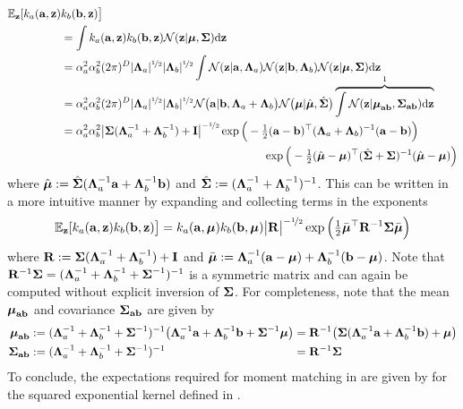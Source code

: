 \begin{align*}
\EE_{\bz}[k_a(\ba,\bz)&k_b(\bb,\bz)\big] \\
&= \int k_a(\ba,\bz)k_b(\bb,\bz) \cN(\bz|\bm, \bS) \dd\bz \\
%
&= \alpha_a^2\alpha_b^2 (2\pi)^{D} |\bLa_a|^{\sha} |\bLa_b|^{\sha}
\int \cN(\bz|\ba,\bLa_a)\cN(\bz|\bb,\bLa_b) \cN(\bz|\bm, \bS) \dd\bz  \\[-0.3cm]
%
&= \alpha_a^2\alpha_b^2 (2\pi)^{D} |\bLa_a|^{\sha} |\bLa_b|^{\sha}
\cN\big(\ba|\bb,\bLa_a+\bLa_b\big) \cN\big(\bm|\hat\bm,\hat\bS \big)
\overbrace{ \int \cN(\bz|\bm_{\ba\bb},\bS_{\ba\bb}) \dd\bz }^{ 1 } \\
%
&= \alpha_a^2 \alpha_b^2 \big|\bS(\bLa_a\inv + \bLa_b\inv) + \bI\big|^{-\sha}
\exp\Big( -\half(\ba-\bb)\T(\bLa_a + \bLa_b)\inv (\ba-\bb) \Big) \\
&\quad\quad\quad\quad\quad\quad\quad\quad\quad\quad\quad\quad\quad\quad\quad\quad\quad\quad
 \exp\Big( -\half(\hat\bm-\bm)\T(\hat\bS + \bS)\inv (\hat\bm-\bm) \Big)
\end{align*}
where $\hat{\boldsymbol{\mu}} := \hat{\boldsymbol{\Sigma}}(\boldsymbol{\Lambda}_a^{-1}\mathbf{a} + \boldsymbol{\Lambda}_b^{-1}\mathbf{b})$ and $\hat{\boldsymbol{\Sigma}} := (\boldsymbol{\Lambda}_a^{-1} + \boldsymbol{\Lambda}_b^{-1})^{-1}$. This can be written in a more intuitive manner by expanding and collecting terms in the exponents
%
\begin{equation}
\mathbb{E}_{\mathbf{z}}[k_a(\mathbf{a},\mathbf{z})k_b(\mathbf{b},\mathbf{z})\big] = k_a(\mathbf{a},\boldsymbol{\mu})k_b(\mathbf{b},\boldsymbol{\mu}) \big|\mathbf{R}\big|^{-\nicefrac{1}{2}}
\exp\Big( \tfrac{1}{2}\bar{\boldsymbol{\mu}}^\top \mathbf{R}^{-1}\boldsymbol{\Sigma} \bar{\boldsymbol{\mu}} \Big)
\label{eqn:SEpropV}
\end{equation}
%
where $\mathbf{R} := \boldsymbol{\Sigma}(\boldsymbol{\Lambda}_a^{-1}+\boldsymbol{\Lambda}_b^{-1}) + \mathbf{I}$ and $\bar{\boldsymbol{\mu}} := \boldsymbol{\Lambda}_a^{-1}(\mathbf{a}-\boldsymbol{\mu}) + \boldsymbol{\Lambda}_b^{-1}(\mathbf{b}-\boldsymbol{\mu})$. Note that $\mathbf{R}^{-1}\boldsymbol{\Sigma} = (\boldsymbol{\Lambda}_a^{-1}+\boldsymbol{\Lambda}_b^{-1} + \boldsymbol{\Sigma}^{-1})^{-1}$ is a symmetric matrix and can again be computed without explicit inversion of $\boldsymbol{\Sigma}$. For completeness, note that the mean $\boldsymbol{\mu}_{\mathbf{a}\mathbf{b}}$ and covariance $\boldsymbol{\Sigma}_{\mathbf{a}\mathbf{b}}$ are given by
\begin{align}
\bm_{\ba\bb} &:= (\bLa_a\inv + \bLa_b\inv + \bS\inv)\inv \big(\bLa_a\inv\ba + \bLa_b\inv\bb + \bS\inv\bm \big)
&&\!\!\!\!\!\!=  \bR\inv \big( \bS(\bLa_a\inv\ba + \bLa_b\inv\bb) + \bm \big)
\label{eqn:muAB} \\
\bS_{\ba\bb} &:= (\bLa_a\inv + \bLa_b\inv + \bS\inv)\inv
&&\!\!\!\!\!\!= \bR\inv \bS
\label{eqn:sigAB}
\end{align}
To conclude, the expectations required for moment matching in  are given by  for the squared exponential kernel defined in .



